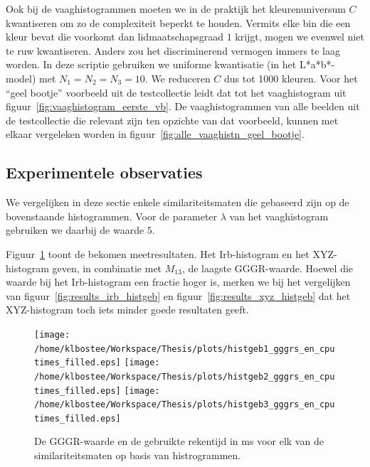 Ook bij de vaaghistogrammen moeten we in de praktijk het kleurenuniversum $C$ 
kwantiseren om zo de complexiteit beperkt te houden. Vermits elke bin die een kleur
bevat die voorkomt dan lidmaatschapsgraad $1$ krijgt, mogen we evenwel niet te
ruw kwantiseren. Anders zou het discriminerend vermogen immers te laag worden. In deze
scriptie gebruiken we uniforme kwantisatie (in het L*a*b*-model) met $N_1=N_2=N_3=10$.
We reduceren $C$ dus tot 1000 kleuren. Voor het ``geel bootje'' voorbeeld uit de testcollectie
leidt dat tot het vaaghistogram uit figuur~\ref{fig:vaaghistogram_eerste_vb}. De vaaghistogrammen 
van alle beelden
uit de testcollectie die relevant zijn ten opzichte van dat voorbeeld, kunnen met
elkaar vergeleken worden in figuur~\ref{fig:alle_vaaghistn_geel_bootje}.

\subsection{Experimentele observaties}
\label{sectie:histogrammen_experimentele_observaties}

We vergelijken in deze sectie enkele similariteitsmaten die gebaseerd zijn op de bovenstaande
histogrammen. Voor de parameter $\lambda$ van het vaaghistogram gebruiken we daarbij
de waarde $5$.

Figuur~\ref{fig:histgeb_gggrs_en_cputimes} toont de bekomen meetresultaten. Het Irb-histogram
en het XYZ-histogram geven, in combinatie met $M_{13}$, de laagste GGGR-waarde. Hoewel die
waarde bij het Irb-histogram een fractie hoger is, merken we bij het vergelijken van 
figuur~\ref{fig:results_irb_histgeb} en figuur~\ref{fig:results_xyz_histgeb} dat het 
XYZ-histogram toch iets minder goede resultaten geeft. 

\begin{figure}[tbp]
\begin{center}
\texttt{[image: /home/klbostee/Workspace/Thesis/plots/histgeb1\_gggrs\_en\_cputimes\_filled.eps]} 
\texttt{[image: /home/klbostee/Workspace/Thesis/plots/histgeb2\_gggrs\_en\_cputimes\_filled.eps]}
\texttt{[image: /home/klbostee/Workspace/Thesis/plots/histgeb3\_gggrs\_en\_cputimes\_filled.eps]}
\caption{\label{fig:histgeb_gggrs_en_cputimes}De GGGR-waarde en de gebruikte rekentijd in ms voor elk 
van de similariteitsmaten op basis van histrogrammen.}
\end{center}
\end{figure}

